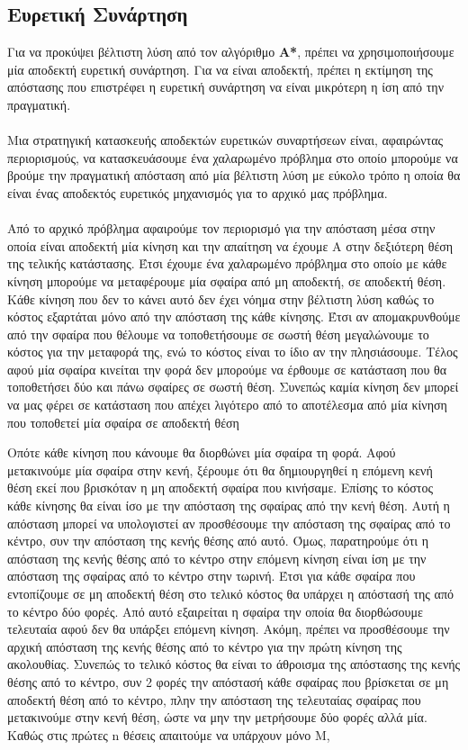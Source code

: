 \documentclass{article}
\begin{document}
    \subsection*{Ευρετική Συνάρτηση}
        Για να προκύψει βέλτιστη λύση από τον αλγόριθμο \textbf{A*}, πρέπει να χρησιμοποιήσουμε μία αποδεκτή ευρετική συνάρτηση. Για να είναι αποδεκτή, πρέπει η εκτίμηση της απόστασης που επιστρέφει η ευρετική συνάρτηση να είναι μικρότερη η ίση από την πραγματική. \\\\
        Μια στρατηγική κατασκευής αποδεκτών ευρετικών συναρτήσεων είναι, αφαιρώντας περιορισμούς, να κατασκευάσουμε ένα χαλαρωμένο πρόβλημα στο οποίο μπορούμε να βρούμε την πραγματική απόσταση από μία βέλτιστη λύση με εύκολο τρόπο η οποία θα είναι ένας αποδεκτός ευρετικός μηχανισμός για το αρχικό μας πρόβλημα.\\\\ 
        Από το αρχικό πρόβλημα αφαιρούμε τον περιορισμό για την απόσταση μέσα στην οποία είναι αποδεκτή μία κίνηση και την απαίτηση να έχουμε Α στην δεξιότερη θέση της τελικής κατάστασης. Έτσι έχουμε ένα χαλαρωμένο πρόβλημα στο οποίο με κάθε κίνηση μπορούμε να μεταφέρουμε μία σφαίρα από μη αποδεκτή, σε αποδεκτή θέση. Κάθε κίνηση που δεν το κάνει αυτό δεν έχει νόημα στην βέλτιστη λύση καθώς το κόστος εξαρτάται μόνο από την απόσταση της κάθε κίνησης. Έτσι αν απομακρυνθούμε από την σφαίρα που θέλουμε να τοποθετήσουμε σε σωστή θέση μεγαλώνουμε το κόστος για την μεταφορά της, ενώ το κόστος είναι το ίδιο αν την πλησιάσουμε. Τέλος αφού μία σφαίρα κινείται την φορά δεν μπορούμε να έρθουμε σε κατάσταση που θα τοποθετήσει δύο και πάνω σφαίρες σε σωστή θέση. Συνεπώς καμία κίνηση δεν μπορεί να μας φέρει σε κατάσταση που απέχει λιγότερο από το αποτέλεσμα από μία κίνηση που τοποθετεί μία σφαίρα σε αποδεκτή θέση \par 
        Οπότε κάθε κίνηση που κάνουμε θα διορθώνει μία σφαίρα τη φορά. Αφού μετακινούμε μία σφαίρα στην κενή, ξέρουμε ότι θα δημιουργηθεί η επόμενη κενή θέση εκεί που βρισκόταν η μη αποδεκτή σφαίρα που κινήσαμε. Επίσης το κόστος κάθε κίνησης θα είναι ίσο με την απόσταση της σφαίρας από την κενή θέση. Αυτή η απόσταση μπορεί να υπολογιστεί αν προσθέσουμε την απόσταση της σφαίρας από το κέντρο, συν την απόσταση της κενής θέσης από αυτό. Όμως, παρατηρούμε ότι η απόσταση της κενής θέσης από το κέντρο στην επόμενη κίνηση είναι ίση με την απόσταση της σφαίρας από το κέντρο στην τωρινή. Έτσι για κάθε σφαίρα που εντοπίζουμε σε μη αποδεκτή θέση στο τελικό κόστος θα υπάρχει η απόστασή της από το κέντρο δύο φορές. Από αυτό εξαιρείται η σφαίρα την οποία θα διορθώσουμε τελευταία αφού δεν θα υπάρξει επόμενη κίνηση. Ακόμη, πρέπει να προσθέσουμε την αρχική απόσταση της κενής θέσης από το κέντρο για την πρώτη κίνηση της ακολουθίας. Συνεπώς το τελικό κόστος θα είναι το άθροισμα της απόστασης της κενής θέσης από το κέντρο, συν 2 φορές την απόστασή κάθε σφαίρας που βρίσκεται σε μη αποδεκτή θέση από το κέντρο, πλην την απόσταση της τελευταίας σφαίρας που μετακινούμε στην κενή θέση, ώστε να μην την μετρήσουμε δύο φορές αλλά μία. Καθώς στις πρώτες n θέσεις απαιτούμε να υπάρχουν μόνο M,
\end{document}
